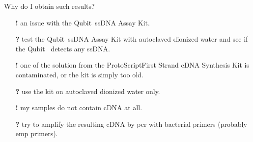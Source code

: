 Why do I obtain such results?
\begin{itemize}
\item[{\color{Bittersweet} \textbf{!}}] an issue with the Qubit\texttrademark ~ssDNA Assay Kit.
\item[{\color{Mint} \textbf{?}}] test the Qubit\texttrademark ~ssDNA Assay Kit with autoclaved dionized water and see if the Qubit\texttrademark~ detects any ssDNA.
\\
\item[{\color{Bittersweet} \textbf{!}}] one of the solution from the ProtoScript\cR First Strand cDNA Synthesis Kit is contaminated, or the kit is simply too old.
\item[{\color{Mint} \textbf{?}}] use the kit on autoclaved dionized water only.
\\
\item[{\color{Bittersweet} \textbf{!}}] my samples do not contain cDNA at all.
\item[{\color{Mint} \textbf{?}}] try to amplify the resulting cDNA by \gls{pcr} with bacterial primers (probably \gls{emp} primers).
\end{itemize}
